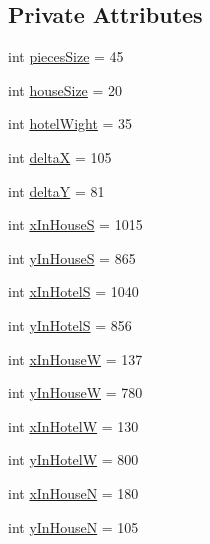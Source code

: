 \subsection*{Private Attributes}
\begin{DoxyCompactItemize}
\item 
int \hyperlink{class_monopoly_1_1_gui_1_1_game_panel_ac11a08bb6197d44bd0b1368dff726cc1}{pieces\+Size} = 45
\item 
int \hyperlink{class_monopoly_1_1_gui_1_1_game_panel_a3bb4a7e0aa696f77e52c01a0f3e493a6}{house\+Size} = 20
\item 
int \hyperlink{class_monopoly_1_1_gui_1_1_game_panel_ad91eeac1bbf98443b641ddee031cf753}{hotel\+Wight} = 35
\item 
int \hyperlink{class_monopoly_1_1_gui_1_1_game_panel_a25aba5e7408249f7e52a0864b0969704}{deltaX} = 105
\item 
int \hyperlink{class_monopoly_1_1_gui_1_1_game_panel_a395756de40a57ccd5ac877b216547df8}{deltaY} = 81
\item 
int \hyperlink{class_monopoly_1_1_gui_1_1_game_panel_ab9994c98fba8ce68ccb2907cab4a6061}{x\+In\+HouseS} = 1015
\item 
int \hyperlink{class_monopoly_1_1_gui_1_1_game_panel_aba9060000ece3843dcdb7c7760aa931c}{y\+In\+HouseS} = 865
\item 
int \hyperlink{class_monopoly_1_1_gui_1_1_game_panel_a0a2c505f94592e3fcfdb966a4b4453c4}{x\+In\+HotelS} = 1040
\item 
int \hyperlink{class_monopoly_1_1_gui_1_1_game_panel_a00a465ba8a26800fc06f8e48f8453698}{y\+In\+HotelS} = 856
\item 
int \hyperlink{class_monopoly_1_1_gui_1_1_game_panel_a38bbec0401e172e38b405c4dd1b16ad1}{x\+In\+HouseW} = 137
\item 
int \hyperlink{class_monopoly_1_1_gui_1_1_game_panel_a13b869ff6b15a120ea34a3d49265cd03}{y\+In\+HouseW} = 780
\item 
int \hyperlink{class_monopoly_1_1_gui_1_1_game_panel_a3840570cda6afa9a2d52098814c4da27}{x\+In\+HotelW} = 130
\item 
int \hyperlink{class_monopoly_1_1_gui_1_1_game_panel_a762e628a4289193e01cf3421624654ed}{y\+In\+HotelW} = 800
\item 
int \hyperlink{class_monopoly_1_1_gui_1_1_game_panel_ad3b9b77d723e42e18cfbadffb569c1aa}{x\+In\+HouseN} = 180
\item 
int \hyperlink{class_monopoly_1_1_gui_1_1_game_panel_ae43dfa7b6bbe50bfcf6aedae15300948}{y\+In\+HouseN} = 105
\item 

\end{DoxyCompactItemize}
